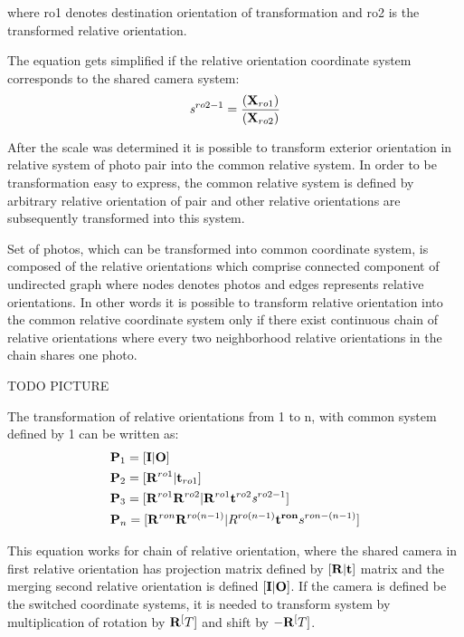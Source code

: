 \documentclass[a4paper,12pt]{report}
\newcommand{\ematr}[1]{
{\bf #1}
}
\newcommand{\evect}[1]{
{\bf #1}
}
\newcommand{\escal}[1]{
{\it #1}
}
\begin{document}
where ro1 denotes destination orientation of transformation and ro2 is the transformed relative orientation. 

The equation gets simplified if the relative orientation coordinate system  corresponds to the shared camera system: 
\begin{equation}
\escal{s}^{ro2-1} = \frac{\mathbf(\evect{X}_{ro1})}
	                 {\mathbf(\evect{X}_{ro2})}
\end{equation}

After the scale was determined it is possible to transform exterior orientation in relative system of photo pair into the common relative system.
In order to be transformation easy to express, the common relative system is defined by arbitrary relative orientation of pair and other 
relative orientations are subsequently transformed into this system. 

Set of photos, which can be transformed into common coordinate system, is composed of the relative orientations
which comprise connected component of undirected graph where nodes denotes photos and edges represents relative orientations. 
In other words it is possible to transform relative orientation into the common relative coordinate system only if there 
exist continuous chain of relative orientations where every two neighborhood relative orientations in the chain shares one photo.

TODO PICTURE

The transformation of relative orientations from 1 to n, with common system defined by 1 can be written as: 
\begin{equation}
\label{eq:comm_rel}
\begin{split}
&\ematr{P}_{1} = [\ematr{I}|\evect{O}] \\
&\ematr{P}_{2} = [\ematr{R}^{ro1}|\evect{t}_{ro1}] \\
&\ematr{P}_{3} = [\ematr{R}^{ro1} \ematr{R}^{ro2}| \ematr{R}^{ro1} \evect{t}^{ro2} \escal{s}^{ro2-1}] \\
&\ematr{P}_{n} = [\ematr{R}^{ron} \ematr{R}^{ro(n - 1)}| R^{ro(n - 1)} \evect{t^{ron}} {s}^{ron- (n-1)}] \\
\end{split}
\end{equation}


This equation works for chain of relative orientation, where the shared camera in first relative orientation has 
projection matrix defined by $[\ematr{R}|\evect{t}]$ matrix and the merging second relative orientation is 
defined $[\ematr{I}|\ematr{O}]$. If the camera is defined be the switched coordinate systems, it is needed to 
transform system by multiplication of rotation by $\ematr{R}^[T]$ and shift by $-\ematr{R}^[T]$.
\end{document}
